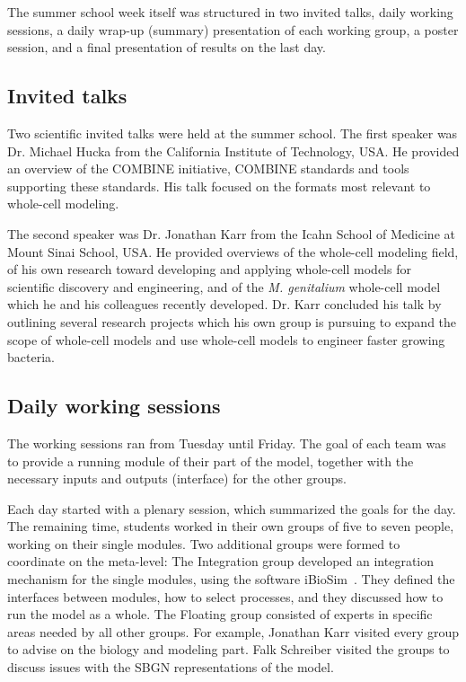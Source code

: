 \documentclass[journal,transmag]{IEEEtran}
\begin{document}
The summer school week itself was structured in two invited talks, daily working sessions, a daily wrap-up (summary) presentation of each working group, a poster session, and a final presentation of results on the last day.

\subsection{Invited talks}
Two scientific invited talks were held at the summer school. 
The first speaker was Dr. Michael Hucka from the California Institute of Technology, USA. 
He provided an overview of the COMBINE initiative, COMBINE standards and tools supporting these standards. 
His talk focused on the formats most relevant to whole-cell modeling. 

The second speaker was Dr. Jonathan Karr from the Icahn School of Medicine at Mount Sinai School, USA. 
He  provided overviews of the whole-cell modeling field, of his own research toward developing and applying whole-cell models for scientific discovery and engineering, and of the \textit{M. genitalium} whole-cell model which he and his colleagues recently developed.
Dr. Karr concluded his talk by outlining several research projects which his own group is pursuing to expand the scope of whole-cell models and use whole-cell models to engineer faster growing bacteria.

\subsection{Daily working sessions}
The working sessions ran from Tuesday until Friday. 
The goal of each team was to provide a running module of their part of the model, together with the necessary inputs and outputs (interface) for the other groups. 

Each day started with a plenary session, which summarized the goals for the day. 
The remaining time, students worked in their own groups of five to seven people, working on their single modules. 
Two additional groups were formed to coordinate on the meta-level: 
The Integration group developed an integration mechanism for the single modules, using the software iBioSim~\cite{Stevens2013}. 
They defined the interfaces between modules, how to select processes, and they discussed how to run the model as a whole.
The Floating group consisted of experts in specific areas needed by all other groups.
For example, Jonathan Karr visited every group to advise on the biology and modeling part. 
Falk Schreiber visited the groups to discuss issues with the SBGN representations of the model. 
\end{document}
